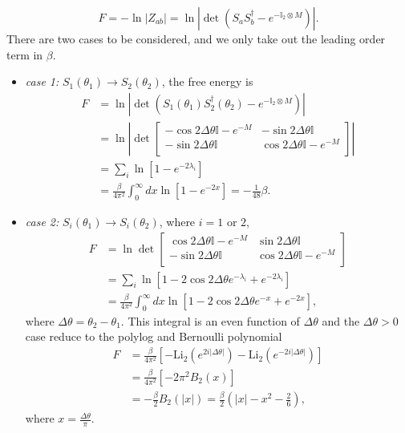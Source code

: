 \begin{equation}
F = - \ln |Z_{ab}| = \ln |\det ( S_a S_b^{\dagger} - e^{- \mathbb{I}_2 \otimes M} )| .
\end{equation}
There are two cases to be considered, and we only take out the leading order term in $\beta$. 
\begin{itemize}
\item {\it case 1: }$S_1( \theta_1 ) \rightarrow S_2 ( \theta_2 ) $, the free energy is
\begin{equation}
\begin{aligned}
F & = \ln |\det ( S_1( \theta_1 )  S_2^{\dagger}( \theta_2 )  - e^{- \mathbb{I}_2 \otimes M} )| \\
  & = \ln \left| \det
\begin{bmatrix}
-\cos 2 \Delta \theta \mathbb{I} - e^{-M}   & -\sin 2 \Delta \theta \mathbb{I}\\
- \sin 2\Delta \theta \mathbb{I}  &   \cos 2 \Delta \theta \mathbb{I} - e^{-M} \\ 
\end{bmatrix} \right| \\
& = \sum_i \ln [ 1 -  e^{- 2 \lambda_i }  ] \\
& = \frac{\beta}{4\pi^2} \int_0^{\infty} dx \ln [ 1 - e^{-2x} ]  = - \frac{1}{48 }\beta .
\end{aligned}
\end{equation}
\item {\it case 2:} $S_i( \theta_1 ) \rightarrow S_i( \theta_2 )$, where $i = 1 $ or $ 2$, 
\begin{equation}
\begin{aligned}
F & = \ln \det 
\begin{bmatrix}
\cos 2 \Delta \theta \mathbb{I} - e^{-M}   & \sin 2 \Delta \theta \mathbb{I}\\
- \sin 2\Delta \theta \mathbb{I}  &   \cos 2 \Delta \theta \mathbb{I} - e^{-M} \\ 
\end{bmatrix} \\
& = \sum_i \ln [ 1 - 2 \cos 2 \Delta \theta e^{- \lambda_i } + e^{- 2 \lambda_i }  ] \\
& = \frac{\beta}{4\pi^2} \int_0^{\infty} dx \ln [ 1 - 2 \cos 2 \Delta \theta e^{-x} + e^{-2x} ] ,
\end{aligned}
\end{equation}
where $\Delta \theta = \theta_2 - \theta_1$. This integral is an even function of $\Delta \theta$ and the $\Delta \theta > 0$ case reduce to the polylog and Bernoulli polynomial
\begin{equation}
\begin{aligned}
  F &= \frac{\beta}{4\pi^2} \left[ - \text{Li}_2 ( e^{2i |\Delta \theta|} ) - \text{Li}_2 ( e^{- 2i |\Delta \theta|} ) \right] \\
  & = \frac{\beta}{4\pi^2}  \left[ - 2\pi^2 B_2 (x) \right] \\
  &= - \frac{\beta}{2} B_2( |x| )  = \frac{\beta}{2} (| x| - x^2 - \frac{2}{6} ),
\end{aligned}
\end{equation}
where $x = \frac{\Delta \theta}{ \pi}$. 
\end{itemize}




